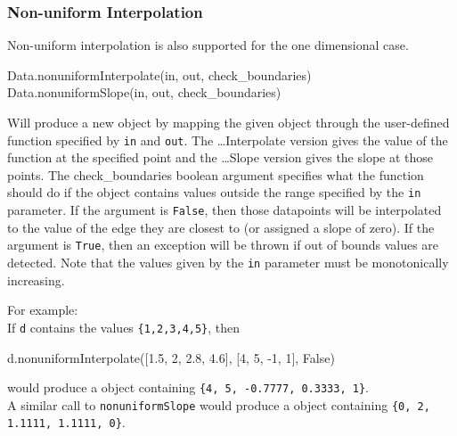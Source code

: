 \subsubsection{Non-uniform Interpolation}
Non-uniform interpolation is also supported for the one dimensional case.
\begin{python}
Data.nonuniformInterpolate(in, out, check_boundaries)
Data.nonuniformSlope(in, out, check_boundaries)
\end{python}

Will produce a new \Data object by mapping the given \Data object through the user-defined function
specified by \texttt{in} and \texttt{out}.
The \ldots Interpolate version gives the value of the function at the specified point and the
\ldots Slope version gives the slope at those points.
The check_boundaries boolean argument specifies what the function should do if the \Data object contains
values outside the range specified by the \texttt{in} parameter.
If the argument is \texttt{False}, then those datapoints will be interpolated to the value of the edge
they are closest to (or assigned a slope of zero).
If the argument is \texttt{True}, then an exception will be thrown if out of bounds values are detected.
Note that the values given by the \texttt{in} parameter must be monotonically increasing.

\noindent For example:\\
If \texttt{d} contains the values \texttt{\{1,2,3,4,5\}}, then
\begin{python}
d.nonuniformInterpolate([1.5, 2, 2.8, 4.6], [4, 5, -1, 1], False)
\end{python}
would produce a \Data object containing \texttt{\{4, 5, -0.7777, 0.3333, 1\}}.\\
A similar call to \texttt{nonuniformSlope} would produce a \Data object containing \texttt{\{0, 2, 1.1111, 1.1111, 0\}}.
%
%
%
%
%
%

